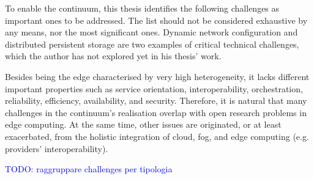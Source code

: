 To enable the continuum, this thesis identifies the following challenges as important ones to be addressed. The list should not be considered exhaustive by any means, nor the most significant ones. Dynamic network configuration and distributed persistent storage are two examples of critical technical challenges, which the author has not explored yet in his thesis' work.

Besides being the edge characterised by very high heterogeneity, it lacks different important properties such as service orientation, interoperability, orchestration, reliability, efficiency, availability, and security. Therefore, it is natural that many challenges in the continuum's realisation overlap with open research problems in edge computing. At the same time, other issues are originated, or at least exacerbated, from the holistic integration of cloud, fog, and edge computing (e.g. providers' interoperability).

\textcolor{blue}{TODO: raggruppare challenges per tipologia}

